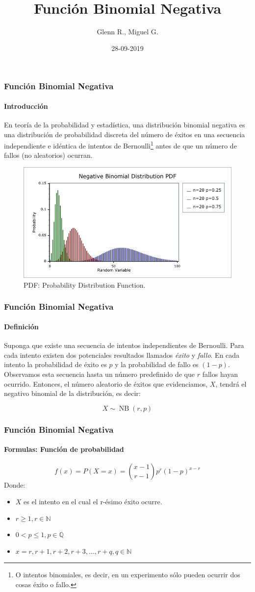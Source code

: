\documentclass{beamer}
\title{Función Binomial Negativa}
\author{Glenn R., Miguel G.}
\institute{Fundación Universitaria Konrad Lorenz}
\date{28-09-2019}
\begin{document}
    \maketitle
    \begin{frame}
		\frametitle{Función Binomial Negativa}
		\framesubtitle{Introducción}
		En teoría de la probabilidad y estadística, una distribución binomial negativa es una distribución de probabilidad discreta del número de éxitos en una secuencia independiente e idéntica de intentos de Bernoulli\footnote{O intentos binomiales, es decir, en un experimento sólo pueden ocurrir dos cosas éxito o fallo.} antes de que un número de fallos (no aleatorios) ocurran.
		\begin{figure}
			\includegraphics[width=0.6\linewidth]{negative-bimonial.png}
			\caption{PDF: Probability Distribution Function.}
			\label{fig:andrew}
		\end{figure}
	\end{frame}
	\begin{frame}
		\frametitle{Función Binomial Negativa}
		\framesubtitle{Definición}
		Suponga que existe una secuencia de intentos independientes de Bernoulli. Para cada intento existen dos potenciales resultados llamados \textit{éxito} y \textit{fallo}. En cada intento la probabilidad de éxito es $p$ y la probabilidad de fallo es $(1 - p)$. Observamos esta secuencia hasta un número predefinido de que $r$ fallos hayan ocurrido. Entonces, el número aleatorio de éxitos que evidenciamos, $X$, tendrá el negativo binomial de la distribución, es decir:
		
        $${X\sim \operatorname {NB} (r,p)}$$
	\end{frame}
	\begin{frame}
		\frametitle{Función Binomial Negativa}
		\framesubtitle{Formulas: Función de probabilidad}
		$$f(x) = P(X = x) = \binom{x - 1}{r - 1} p^r (1 - p)^{x-r}$$
		Donde:
		\begin{itemize}
		    \item $X$ es el intento en el cual el r-ésimo éxito ocurre.
		    \item $r \geq 1, r \in \mathbb{N}$
		    \item $0 < p \leq 1, p \in \mathbb{Q}$
		    \item $x = r, r + 1, r + 2, r + 3, \dots , r + q, q \in \mathbb{N}$
		\end{itemize}
	\end{frame}
\end{document}
